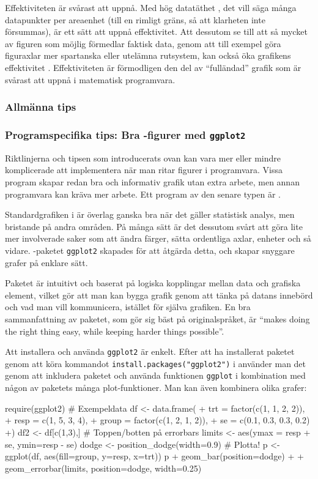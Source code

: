 \documentclass[lang=sv,ptsize=10pt,font=none,nomath,titles=bf,../../a4.tex]{subfiles}
\begin{document}
Effektiviteten är svårast att uppnå. Med hög datatäthet
\parencite[\pno~162]{Tufte01}, det vill säga många datapunkter per
areaenhet (till en rimligt gräns, så att klarheten inte försummas), är
ett sätt att uppnå effektivitet. Att dessutom se till att så mycket av figuren som möjlig förmedlar faktisk data, genom att till exempel göra
figuraxlar mer spartanska eller utelämna rutsystem, kan också öka
grafikens effektivitet \parencite[\ppno~123\psqq]{Tufte01}. 
Effektiviteten är förmodligen den del av \enquote{fulländad} grafik
som är svårast att uppnå i matematisk programvara.

\subsubsection{Allmänna tips}

\subsubsection{Programspecifika tips: %
			   Bra \Rlogo-figurer med \texttt{ggplot2}}
\label{sec:ggplot2}
Riktlinjerna och tipsen som introducerats ovan kan vara mer eller mindre
komplicerade att implementera när man ritar figurer i programvara. Vissa
program skapar redan bra och informativ grafik utan extra arbete, men
annan programvara kan kräva mer arbete. Ett program av den senare typen
är \Rlogo.

Standardgrafiken i \Rlogo är överlag ganska bra när det gäller statistisk
analys, men bristande på andra områden. På många sätt är det dessutom 
svårt att göra lite mer involverade saker som att ändra färger, sätta
ordentliga axlar, enheter och så vidare. \Rlogo-paketet \texttt{ggplot2}
skapades för att åtgärda detta, och skapar snyggare grafer på enklare
sätt.

Paketet är intuitivt och baserat på logiska kopplingar mellan data och
grafiska element, vilket gör att man kan bygga grafik genom att tänka
på datans innebörd och vad man vill kommunicera, istället för själva 
grafiken. En bra sammanfattning av paketet, som gör sig bäst på
originalspråket, är \foreignquote{british}{makes doing the right thing
easy, while keeping harder things possible}.

Att installera och använda \texttt{ggplot2} är enkelt. Efter att ha 
installerat paketet genom att köra kommandot
\verb|install.packages("ggplot2")|
i \Rlogo använder man det genom att inkludera paketet och använda
funktionen \texttt{ggplot} i kombination med någon av paketets många
plot-funktioner. Man kan även kombinera olika grafer:
\begin{rcode}
require(ggplot2)
# Exempeldata
df <- data.frame(
+   trt = factor(c(1, 1, 2, 2)),
+   resp = c(1, 5, 3, 4), 
+   group = factor(c(1, 2, 1, 2)),
+   se = c(0.1, 0.3, 0.3, 0.2)
+) 
df2 <- df[c(1,3),] 
# Toppen/botten på errorbars
limits <- aes(ymax = resp + se, ymin=resp - se)
dodge <- position_dodge(width=0.9)
# Plotta!
p <- ggplot(df, aes(fill=group, y=resp, x=trt))
p + geom_bar(position=dodge) +
  + geom_errorbar(limits, position=dodge, width=0.25)
\end{rcode}
\end{document}

